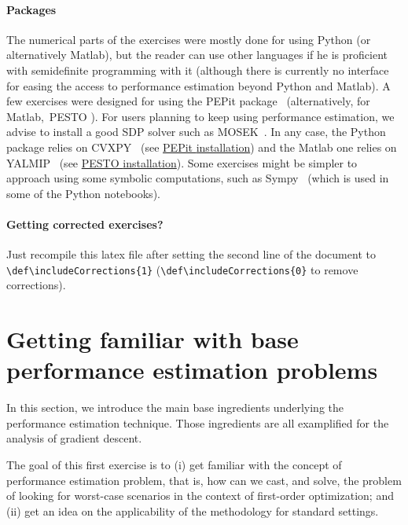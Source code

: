 \documentclass[11pt,a4paper]{article}
\def\includeCorrections{0} %
\newcommand{\pesto}{{PESTO }}
\newcommand{\pepit}{{PEPit }}
\begin{document}
\paragraph{Packages} The numerical parts of the exercises were mostly done for using Python (or alternatively Matlab), but the reader can use other languages if he is proficient with semidefinite programming with it (although there is currently no interface for easing the access to performance estimation beyond Python and Matlab). A few exercises were designed for using the \pepit package~\cite{goujaud2022pepit} (alternatively, for Matlab,~\pesto\cite{pesto2017}). For users planning to keep using performance estimation, we advise to install a good SDP solver such as MOSEK~\cite{mosek2010}. In any case, the Python package relies on CVXPY~\cite{diamond2016cvxpy} (see \href{https://github.com/PerformanceEstimation/PEPit}{\pepit installation}) and the Matlab one relies on YALMIP~\cite{Yalmip2004} (see \href{https://github.com/PerformanceEstimation/Performance-Estimation-Toolbox/wiki/Toolbox-(and-dependencies)-installation}{\pesto installation}). Some exercises might be simpler to approach using some symbolic computations, such as Sympy~\cite{meurer2017sympy} (which is used in some of the Python notebooks). 

{\color{blue}\paragraph{Getting corrected exercises?} Just recompile this latex file after setting the second line of the document to \verb?\def\includeCorrections{1}? (\verb?\def\includeCorrections{0}? to remove corrections).}

	\section{Getting familiar with base performance estimation problems}	\label{s:pep_basis}	%
	In this section, we introduce the main base ingredients underlying the performance estimation technique. Those ingredients are all examplified for the analysis of gradient descent.
	
	The goal of this first exercise is to (i) get familiar with the concept of performance estimation problem, that is, how can we cast, and solve, the problem of looking for worst-case scenarios in the context of first-order optimization; and (ii) get an idea on the applicability of the methodology for standard settings.
	
\end{document}
